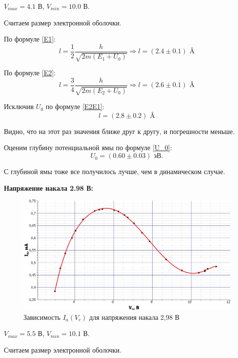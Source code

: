 \documentclass[12pt,a4paper]{article}
\begin{document}
\begin{enumerate}
		$V_{max} = 4.1$ В, $V_{min} = 10.0$ В.
		
		Считаем размер электронной оболочки.
		
		По формуле \eqref{E1}:
		\begin{equation*}
			l = \frac{1}{2}\frac{h}{\sqrt{2m(E_1 + U_0)}} \Longrightarrow l = (2.4 \pm 0.1) \text{ \AA}
		\end{equation*}
		
		По формуле \eqref{E2}:
		\begin{equation*}
			l = \frac{3}{4}\frac{h}{\sqrt{2m(E_2 + U_0)}} \Longrightarrow l = (2.6 \pm 0.1) \text{ \AA}
		\end{equation*}
		
		Исключив $U_0$ по формуле \eqref{E2E1}:
		\begin{equation*}
			l = (2.8 \pm 0.2) \text{ \AA}
		\end{equation*}
	
		Видно, что на этот раз значения ближе друг к другу, и погрешности меньше.
	
		Оценим глубину потенциальной ямы по формуле \eqref{U_0}:
		\begin{equation*}
			U_0 = (0.60 \pm 0.03) \text{ эВ}.
		\end{equation*}
		
		С глубиной ямы тоже все получилось лучше, чем в динамическом случае.

	
		\textbf{Напряжение накала 2.98 В:}
		\begin{figure}[h!]
			\centering
			\includegraphics[width=\linewidth]{src/Ia(Vc)_298.jpg}
			\caption{Зависимость $I_a(V_c)$ для напряжения накала 2,98 В}
		\end{figure}
		
		$V_{max} = 5.5$ В, $V_{min} = 10.1$ В.
		
		Считаем размер электронной оболочки.
		

\end{enumerate}
\end{document}
